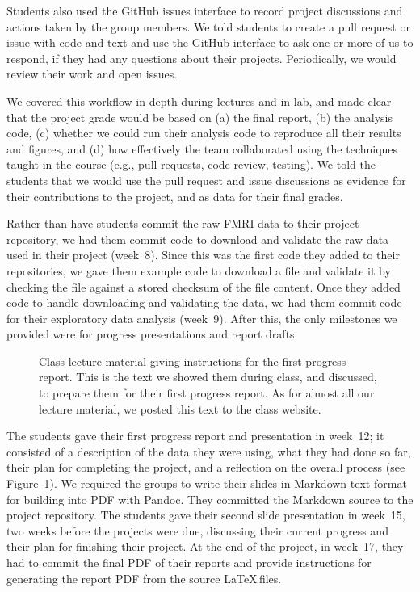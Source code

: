 Students also used the GitHub issues interface to record project discussions
and actions taken by the group members.
We told students to create a pull request
or issue with code and text and use the GitHub interface to ask one or more
of us to respond, if they had any questions about their projects.
Periodically, we would review their work and open issues.

We covered this workflow in depth during lectures and in lab,
and made clear that the project grade would be based on
(a) the final report,
(b) the analysis code,
(c) whether we could run their analysis code to reproduce all
their results and figures, and
(d) how effectively the team collaborated using the techniques
taught in the course (e.g., pull requests, code review, testing).
We told the students that we would use the pull request and issue
discussions as evidence for their contributions to the project, and as data for
their final grades.

Rather than have students commit the raw FMRI data to their project repository, we had
them commit code to download and validate
the raw data used in their project (week~8).
Since this was the first code they added to their repositories, we gave them example
code to download a file and validate it by checking the file against a stored
checksum of the file content.
Once they added code to handle downloading and validating the data,
we had them commit code for their exploratory data analysis (week~9).
After this, the only milestones we provided were for progress
presentations and report drafts.

\begin{figure}
\centering
\begin{tiny}

\end{tiny}
\caption{Class lecture material giving instructions for the first progress
    report.  This is the text we showed them during class, and discussed, to
    prepare them for their first progress report.  As for almost all our
    lecture material, we posted this text to the class website.}
\label{fig:progress}
\end{figure}


The students gave their first progress report and presentation in week~12;
it consisted of a description of the data they were using, what they had done
so far, their plan for completing the project, and a reflection on the overall
process (see Figure~\ref{fig:progress}).
We required the groups to write their slides in Markdown text format for
building into PDF with Pandoc.  They committed the Markdown source to the
project repository.
The students gave their second slide presentation in week~15, two weeks before
the projects were due, discussing their current progress and their plan for
finishing their project.
At the end of the project, in week~17, they had to commit the final PDF of
their reports and provide instructions for generating the report PDF
from the source \LaTeX\,files.

